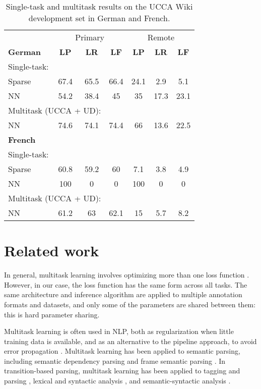 \documentclass[11pt,a4paper]{article}
\begin{document}
\begin{table}
\begin{tabular}{lccc|ccc}
& \multicolumn{3}{c|}{Primary} & \multicolumn{3}{c}{Remote} \\
\textbf{German} & \textbf{LP} & \textbf{LR} & \textbf{LF} & \textbf{LP} & \textbf{LR} & \textbf{LF} \\
\multicolumn{3}{l}{Single-task:} \\
\small Sparse & 67.4 & 65.5 & 66.4 & 24.1 & 2.9 & 5.1 \\
\small NN & 54.2 & 38.4 & 45 & 35 & 17.3 & 23.1 \\
\multicolumn{3}{l}{Multitask (UCCA + UD):} \\
\small NN & 74.6 & 74.1 & 74.4 & 66 & 13.6 & 22.5 \\
\hline
\textbf{French} \\
\multicolumn{3}{l}{Single-task:} \\
\small Sparse & 60.8 & 59.2 & 60 & 7.1 & 3.8 & 4.9 \\
\small NN & 100 & 0 & 0 & 100 & 0 & 0 \\
\multicolumn{3}{l}{Multitask (UCCA + UD):} \\
\small NN & 61.2 & 63 & 62.1 & 15 & 5.7 & 8.2
\end{tabular}
\caption{Single-task and multitask results on the UCCA Wiki development set in German and French.\label{tab:multilingual}}
\end{table}



\section{Related work}\label{sec:related_work}

In general, multitask learning involves optimizing more than one loss function \cite{ruder2017overview}.
However, in our case, the loss function has the same form across all tasks.
The same architecture and inference algorithm are applied to multiple annotation formats and datasets,
and only some of the parameters are shared between them: this is hard parameter sharing.

Multitask learning is often used in NLP, both as regularization when little training data is available,
and as an alternative to the pipeline approach, to avoid error propagation
\cite{collobert2008unified}.
Multitask learning has been applied to semantic parsing, including
semantic dependency parsing \cite{P17-1186} and
frame semantic parsing \cite{swayamdipta2017frame}.
In transition-based parsing, multitask learning has been applied to
tagging and parsing \cite{bohnet2012transition,Zhang2016StackpropagationIR},
lexical and syntactic analysis \cite{constant-nivre:2016:P16-1,more2016joint},
and semantic-syntactic analysis \cite{swayamdipta-EtAl:2016:CoNLL,henderson2013multilingual}.
\end{document}

